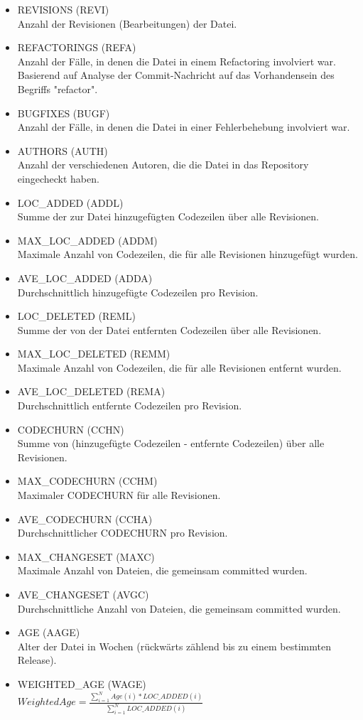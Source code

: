 \label{moser-metrics}
\begin{multicols}{2}
\begin{itemize}
\setlength{\itemsep}{-2pt}
\item REVISIONS (REVI)\\Anzahl der Revisionen (Bearbeitungen) der Datei.
\item REFACTORINGS (REFA)\\Anzahl der Fälle, in denen die Datei in einem Refactoring involviert war. Basierend auf Analyse der Commit-Nachricht auf das Vorhandensein des Begriffs "refactor".
\item BUGFIXES (BUGF)\\Anzahl der Fälle, in denen die Datei in einer Fehlerbehebung involviert war.
\item AUTHORS (AUTH)\\Anzahl der verschiedenen Autoren, die die Datei in das Repository eingecheckt haben.
\item LOC\_ADDED (ADDL)\\Summe der zur Datei hinzugefügten Codezeilen über alle Revisionen.
\item MAX\_LOC\_ADDED (ADDM)\\Maximale Anzahl von Codezeilen, die für alle Revisionen hinzugefügt wurden.
\item AVE\_LOC\_ADDED (ADDA)\\Durchschnittlich hinzugefügte Codezeilen pro Revision.
\item LOC\_DELETED (REML)\\Summe der von der Datei entfernten Codezeilen über alle Revisionen.
\item MAX\_LOC\_DELETED (REMM)\\Maximale Anzahl von Codezeilen, die für alle Revisionen entfernt wurden.
\item AVE\_LOC\_DELETED (REMA)\\Durchschnittlich entfernte Codezeilen pro Revision.
\item CODECHURN (CCHN)\\Summe von (hinzugefügte Codezeilen - entfernte Codezeilen) über alle Revisionen.
\item MAX\_CODECHURN (CCHM)\\Maximaler CODECHURN für alle Revisionen.
\item AVE\_CODECHURN (CCHA)\\Durchschnittlicher CODECHURN pro Revision.
\item MAX\_CHANGESET (MAXC)\\Maximale Anzahl von Dateien, die gemeinsam committed wurden.
\item AVE\_CHANGESET (AVGC)\\Durchschnittliche Anzahl von Dateien, die gemeinsam committed wurden.
\item AGE (AAGE)\\Alter der Datei in Wochen (rückwärts zählend bis zu einem bestimmten Release).
\item WEIGHTED\_AGE (WAGE)\\$Weighted Age = \frac{\sum_{i=1}^N Age(i)*LOC\_ADDED(i)}{\sum_{i=1}^N LOC\_ADDED(i)}$
\end{itemize}
\end{multicols}

